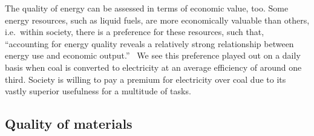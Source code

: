 The quality of energy can be assessed in terms of economic value, too.
Some energy resources, such as liquid fuels, 
are more economically valuable than others,
i.e.\ within society, there is a preference for these resources,
such that, ``accounting for energy quality reveals a relatively strong relationship 
between energy use and economic output.''~\cite[p.~313]{Cleveland2000}
We see this preference played out on a daily basis
when coal is converted to electricity at 
an average efficiency of around one third.
Society is willing to pay a premium for electricity
over coal due to its vastly superior usefulness 
for a multitude of tasks.

\subsection{Quality of materials}
\label{sec:material_quality}


%
%

